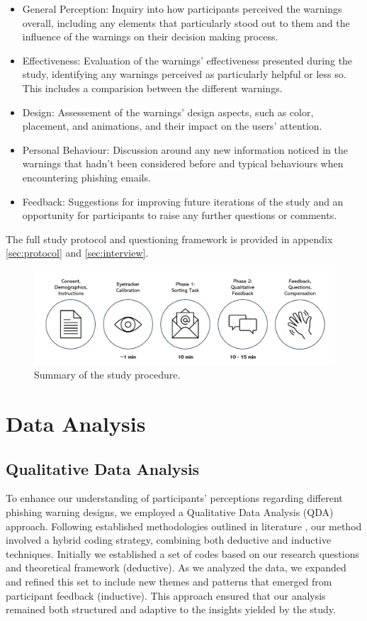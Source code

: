 \documentclass[
  a4paper,  %
  twoside,  %
  bibliography=totoc,
  headsepline,
  cleardoublepage=empty,
  parskip=half,
  draft=false
]{scrbook}
\begin{document}
\begin{itemize}
    \item General Perception: Inquiry into how participants perceived the warnings overall, including any elements that particularly stood out to them and the influence of the warnings on their decision making process.
    \item Effectiveness: Evaluation of the warnings' effectiveness presented during the study, identifying any warnings perceived as particularly helpful or less so. This includes a comparision between the different warnings.
    \item Design: Assessement of the warnings' design aspects, such as color, placement, and animations, and their impact on the users' attention.
    \item Personal Behaviour: Discussion around any new information noticed in the warnings that hadn't been considered before and typical behaviours when encountering phishing emails.
    \item Feedback: Suggestions for improving future iterations of the study and an opportunity for participants to raise any further questions or comments. 
\end{itemize}
 
The full study protocol and questioning framework is provided in appendix \ref{sec:protocol} and \ref{sec:interview}.

\begin{figure} [ht]
    \centering
    \includegraphics[width=1\linewidth]{figures/studysteps.png}
    \caption{Summary of the study procedure.}
    \label{fig:steps}
\end{figure}

\section{Data Analysis}
\subsection{Qualitative Data Analysis}
To enhance our understanding of participants' perceptions regarding different phishing warning designs, we employed a Qualitative Data Analysis (QDA) approach. Following established methodologies outlined in literature \cite{qda}, our method involved a hybrid coding strategy, combining both deductive and inductive techniques. Initially we established a set of codes based on our research questions and theoretical framework (deductive). As we analyzed the data, we expanded and refined this set to include new themes and patterns that emerged from participant feedback (inductive). This approach ensured that our analysis remained both structured and adaptive to the insights yielded by the study.
\end{document}
